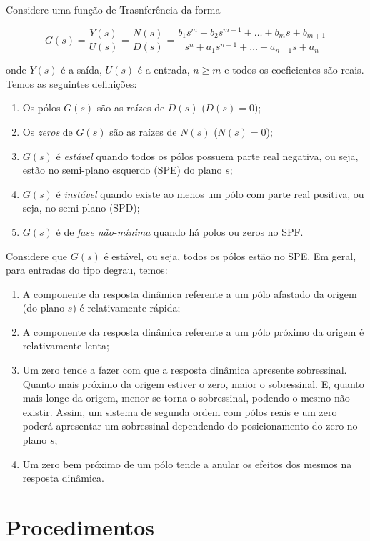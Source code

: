 \documentclass[
]{book}
\providecommand{\tightlist}{%
  \setlength{\itemsep}{0pt}\setlength{\parskip}{0pt}}
\begin{document}
Considere uma função de Trasnferência da forma

\[
G(s) = \frac{Y(s)}{U(s)} = \frac{N(s)}{D(s)} = \frac{b_1s^m +b_2s^{m-1} + \dots + b_ms + b_{m+1}}{s^n + a_1s^{n-1}+ \dots + a_{n-1}s + a_n}
\]

onde \(Y(s)\) é a saída, \(U(s)\) é a entrada, \(n \geq m\) e todos os coeficientes são reais. Temos as seguintes definições:

\begin{enumerate}
\def\labelenumi{\arabic{enumi}.}
\tightlist
\item
  Os pólos \(G(s)\) são as raízes de \(D(s)\) (\(D(s) = 0\));
\item
  Os \emph{zeros} de \(G(s)\) são as raízes de \(N(s)\) (\(N(s) = 0\));
\item
  \(G(s)\) é \emph{estável} quando todos os pólos possuem parte real negativa, ou seja, estão no semi-plano esquerdo (SPE) do plano \(s\);
\item
  \(G(s)\) é \emph{instável} quando existe ao menos um pólo com parte real positiva, ou seja, no semi-plano (SPD);
\item
  \(G(s)\) é de \emph{fase não-mínima} quando há polos ou zeros no SPF.
\end{enumerate}

Considere que \(G(s)\) é estável, ou seja, todos os pólos estão no SPE. Em geral, para entradas do tipo degrau, temos:

\begin{enumerate}
\def\labelenumi{\arabic{enumi}.}
\tightlist
\item
  A componente da resposta dinâmica referente a um pólo afastado da origem (do plano \(s\)) é relativamente rápida;
\item
  A componente da resposta dinâmica referente a um pólo próximo da origem é relativamente lenta;
\item
  Um zero tende a fazer com que a resposta dinâmica apresente sobressinal. Quanto mais próximo da origem estiver o zero, maior o sobressinal. E, quanto mais longe da origem, menor se torna o sobressinal, podendo o mesmo não existir. Assim, um sistema de segunda ordem com pólos reais e um zero poderá apresentar um sobressinal dependendo do posicionamento do zero no plano \(s\);
\item
  Um zero bem próximo de um pólo tende a anular os efeitos dos mesmos na resposta dinâmica.
\end{enumerate}

\hypertarget{procedimentos}{%
\section{Procedimentos}\label{procedimentos}}
\end{document}
